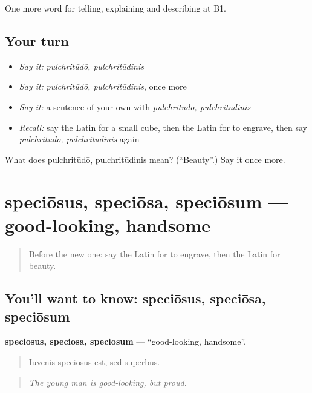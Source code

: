 \begin{grammarlens}[title={What you've built}]
One more word for telling, explaining and describing at B1.
\end{grammarlens}

\subsection*{Your turn}
\begin{itemize}
\raggedright
  \item \emph{Say it:} \emph{pulchritūdō, pulchritūdinis}
  \item \emph{Say it:} \emph{pulchritūdō, pulchritūdinis}, once more
  \item \emph{Say it:} a sentence of your own with \emph{pulchritūdō, pulchritūdinis}
  \item \emph{Recall:} say the Latin for a small cube, then the Latin for to engrave, then say \emph{pulchritūdō, pulchritūdinis} again
\end{itemize}

\begin{tcolorbox}[breakable,colback=teal!4,colframe=teal!35!black,title={Before you move on}]
What does pulchritūdō, pulchritūdinis mean? (\textquotedblleft{}Beauty\textquotedblright{}.) Say it once more.
\end{tcolorbox}
\section[speciōsus, speciōsa, speciōsum]{speciōsus, speciōsa, speciōsum — good-looking, handsome}

\label{lesson:LA-C548-speciosus}



\begin{quote}
Before the new one: say the Latin for to engrave, then the Latin for beauty.
\end{quote}

\subsection*{You'll want to know: speciōsus, speciōsa, speciōsum}
\textbf{speciōsus, speciōsa, speciōsum} — \textquotedblleft{}good-looking, handsome\textquotedblright{}.

\begin{quote}
Iuvenis speciōsus est, sed superbus.
\end{quote}

\begin{quote}
\emph{The young man is good-looking, but proud.}
\end{quote}

